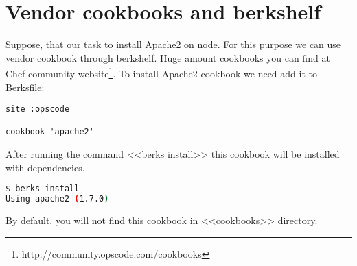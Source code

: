 \section{Vendor cookbooks and berkshelf}

Suppose, that our task to install Apache2 on node. For this purpose we can use vendor cookbook through berkshelf. Huge amount cookbooks you can find at Chef community website\footnote{http://community.opscode.com/cookbooks}. To install Apache2 cookbook we need add it to Berksfile:

\begin{lstlisting}[label=lst:my-cloud-berkshelf1,title=my-cloud/Berksfile]
site :opscode

cookbook 'apache2'
\end{lstlisting}

After running the command <<berks install>> this cookbook will be installed with dependencies.

\begin{lstlisting}[language=Bash,label=lst:my-cloud-berkshelf2,title=my-cloud/Berksfile]
$ berks install
Using apache2 (1.7.0)
\end{lstlisting}

By default, you will not find this cookbook in <<cookbooks>> directory.